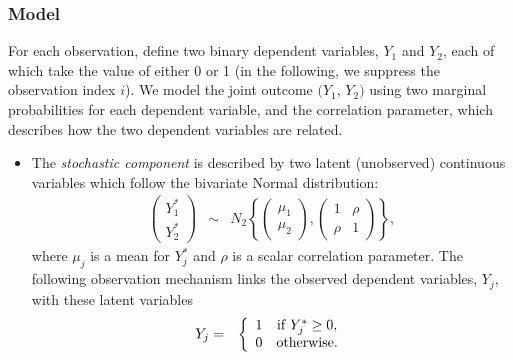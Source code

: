 \subsubsection{Model}

For each observation, define two binary dependent variables, $Y_1$ and
$Y_2$, each of which take the value of either 0 or 1 (in the
following, we suppress the observation index $i$).  We model the joint
outcome $(Y_1$, $Y_2)$ using two marginal probabilities for each
dependent variable, and the correlation parameter, which describes how
the two dependent variables are related. 

\begin{itemize}
\item The \emph{stochastic component} is described by two latent (unobserved)
  continuous variables which follow the bivariate Normal distribution:
\begin{eqnarray*}
  \left ( \begin{array}{c} 
      Y_1^* \\
      Y_2^* 
    \end{array}
  \right ) &\sim &  
  N_2 \left \{ \left ( 
      \begin{array}{c}
        \mu_1 \\ \mu_2
      \end{array} \right ), \left( \begin{array}{cc}
                 1 & \rho \\
                 \rho & 1 
                 \end{array} \right) \right\},
\end{eqnarray*}
where $\mu_j$ is a mean for $Y_j^*$ and $\rho$ is a scalar correlation
parameter. The following observation mechanism links the observed
dependent variables, $Y_j$, with these latent variables
\begin{eqnarray*}
Y_j & = & \left \{ \begin{array}{cc}
                   1 & {\rm if} \; Y_j^* \ge 0, \\
                   0 & {\rm otherwise.}
                   \end{array} 
                   \right.
\end{eqnarray*}



\end{itemize}
